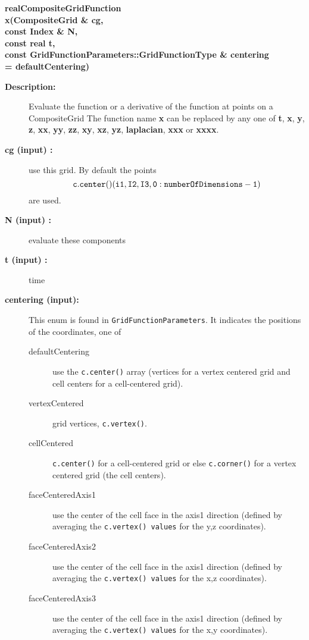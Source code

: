  
\begin{flushleft} \textbf{%
realCompositeGridFunction  \\ 
\settowidth{\OGFunctionIncludeArgIndent}{x(}%
x(CompositeGrid \& cg, \\ 
\hspace{\OGFunctionIncludeArgIndent}const Index \& N, \\ 
\hspace{\OGFunctionIncludeArgIndent}const real t,\\ 
\hspace{\OGFunctionIncludeArgIndent}const GridFunctionParameters::GridFunctionType \& centering\\ 
\hspace{\OGFunctionIncludeArgIndent}= defaultCentering)
}\end{flushleft}
\begin{description}
\item[{\bf Description:}]  Evaluate the function or a derivative of the function at points on a CompositeGrid
    The function name {\bf x} can be replaced by any one of {\bf t}, {\bf x}, {\bf y}, {\bf z}, {\bf xx},
     {\bf yy}, {\bf zz}, {\bf xy}, {\bf xz}, {\bf yz}, {\bf laplacian}, {\bf xxx} or {\bf xxxx}.
\item[{\bf cg (input) :}]  use this grid.
     By default the points \[ {\tt c.center()(i1,I2,I3,0:numberOfDimensions-1)}\] are used.
\item[{\bf N (input) :}]  evaluate these components
\item[{\bf t (input) :}]  time
\item[{\bf centering (input):}]  This enum is found in {\tt GridFunctionParameters}.
       It indicates the positions of the coordinates, one of 
   \begin{description} 
    \item[defaultCentering] use the {\tt c.center()} array (vertices for a vertex centered grid
       and cell centers for a cell-centered grid).
    \item[vertexCentered] grid vertices, {\tt c.vertex()}.
    \item[cellCentered] {\tt c.center()} for a cell-centered grid or else {\tt c.corner()} for
        a vertex centered grid (the cell centers).
    \item[faceCenteredAxis1] use the center of the cell face in the axis1 direction (defined
       by averaging the {\tt c.vertex() values} for the y,z coordinates).
    \item[faceCenteredAxis2] use the center of the cell face in the axis1 direction (defined
       by averaging the {\tt c.vertex() values} for the x,z coordinates).
    \item[faceCenteredAxis3] use the center of the cell face in the axis1 direction (defined
       by averaging the {\tt c.vertex() values} for the x,y coordinates).
  \end{description}
\end{description}
